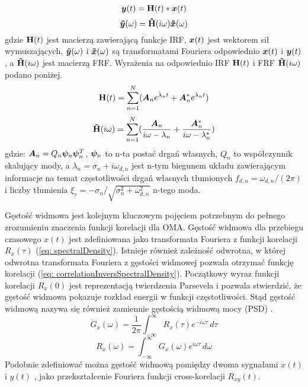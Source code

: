 \begin{equation} \label{eq: mimoIRFyx}
	\bm{y}(t)=\mathbf{H}(t)*\bm{x}(t)
\end{equation}
\begin{equation} \label{eq: mimoFRFyx}
	\bm{\tilde{y}}(\omega)=\mathbf{\tilde{H}}(i\omega)\bm{\tilde{x}}(\omega)
\end{equation}
gdzie $\mathbf{H}(t)$ jest macierzą zawierającą funkcje IRF, $\bm{x}(t)$ jest wektorem sił wymuszających, $\bm{\tilde{y}}(\omega)$ i $\bm{\tilde{x}}(\omega)$ są transformatami Fouriera odpowiednio $\bm{x}(t)$ i $\bm{y}(t)$, a $\mathbf{\tilde{H}}(i\omega)$ jest macierzą FRF. Wyrażenia na odpowiednio IRF $\mathbf{H}(t)$ i FRF $\mathbf{\tilde{H}}(i\omega)$ podano poniżej.
\begin{equation} \label{eq: IRFmimo}
	\mathbf{H}(t)=\sum_{n=1}^{N}(\bm{A}_n e^{\lambda_n t} + \bm{A}_n^* e^{\lambda_n t})
\end{equation} 
\begin{equation} \label{eq: FRFmimo}
	\mathbf{\tilde{H}}(i\omega)=\sum_{n=1}^{N}(\frac{\bm{A}_n}{i\omega-\lambda_n} + \frac{\bm{A}_n^*}{i\omega-\lambda_n^*})
\end{equation}
gdzie: $\bm{A}_n=Q_n \bm{\psi}_n\bm{\psi}_n^T$, $\bm{\psi}_n$ to n-ta postać drgań własnych, $Q_n$ to współczynnik skalujący mody, a $\lambda_n=\sigma_n+i\omega_{d,n}$ jest n-tym biegunem układu zawierającym informacje na temat częstotliwości drgań własnych tłumionych $f_{d,n}=\omega_{d,n}/(2\pi)$ i liczby tłumienia $\xi_r=-\sigma_n/\sqrt{\sigma_n^2+\omega_{d,n}^2}$ n-tego moda.






Gęstość widmowa jest kolejnym kluczowym pojęciem potrzebnym do pełnego zrozumieniu znaczenia funkcji korelacji dla OMA. Gęstość widmowa  dla przebiegu czasowego $x(t)$ jest zdefiniowana jako transformata Fouriera z funkcji korelacji $R_x(\tau)$ (\ref{eq: spectralDensity}). Istnieje również zależność odwrotna, w której odwrotna transformata Fouriera z gęstości widmowej pozwala otrzymać funkcję korelacji (\ref{eq: correlationInversSpectralDensity}). Początkowy wyraz funkcji korelacji $R_x(0)$ jest reprezentacją twierdzenia Parsevela i pozwala stwierdzić, że gęstość widmowa pokazuje rozkład energii w funkcji częstotliwości. Stąd gęstość widmową nazywa się również zamiennie gęstością widmową mocy  (PSD) \parencite{Brincker2015}.
\begin{equation} \label{eq: spectralDensity}
	G_x(\omega) = \frac{1}{2\pi}\int_{-\infty}^{\infty}R_x(\tau)e^{-i\omega\tau}\,d\tau
\end{equation}
\begin{equation} \label{eq: correlationInversSpectralDensity}
	R_x(\omega) = \int_{-\infty}^{\infty}G_x(\omega)e^{i\omega\tau}\,d\omega
\end{equation}
Podobnie zdefiniować można gęstość widmową pomiędzy dwoma sygnałami $x(t)$ i $y(t)$ , jako przekształcenie Fouriera funkcji cross-korelacji $R_{xy}(t)$. 


